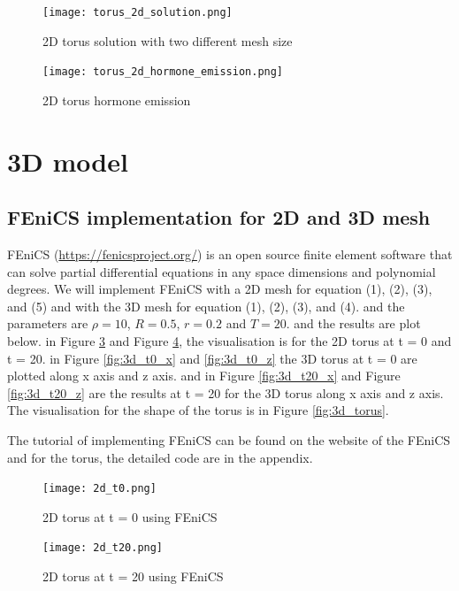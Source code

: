 \documentclass[12pt]{article}
\begin{document}
\begin{figure}[H] %
\centering
\texttt{[image: torus\_2d\_solution.png]}
\caption{2D torus solution with two different mesh size}
\label{fig:2d_fem}
\end{figure}

\begin{figure}[H] %
\centering
\texttt{[image: torus\_2d\_hormone\_emission.png]}
\caption{2D torus hormone emission}
\label{fig:2d_massloss}
\end{figure}


\section{3D model}

\subsection{FEniCS implementation for 2D and 3D mesh}
FEniCS (\url{https://fenicsproject.org/}) is an open source finite element software that can solve partial differential equations in any space dimensions and polynomial degrees. We will implement FEniCS with a 2D mesh for equation (1), (2), (3), and (5) and with the 3D mesh for equation (1), (2), (3), and (4). and the parameters are $\rho = 10$, $R = 0.5$, $r = 0.2$ and $ T = 20$. and the results are plot below. in Figure \ref{fig:2d_t0_fenics} and Figure \ref{fig:2d_t20_fenics}, the visualisation is for the 2D torus at t = 0 and t = 20. in Figure \ref{fig:3d_t0_x} and \ref{fig:3d_t0_z} the 3D torus at t = 0 are plotted along x axis and z axis. and in Figure \ref{fig:3d_t20_x} and Figure \ref{fig:3d_t20_z} are the results at t = 20 for the 3D torus along x axis and z axis. The visualisation for the shape of the torus is in Figure \ref{fig:3d_torus}. \par
The tutorial of implementing FEniCS can be found on the website of the FEniCS and for the torus, the detailed code are in the appendix. \par

\begin{figure}[H] %
\centering
\texttt{[image: 2d\_t0.png]}
\caption{2D torus at t = 0 using FEniCS}
\label{fig:2d_t0_fenics}
\end{figure}

\begin{figure}[H] %
\centering
\texttt{[image: 2d\_t20.png]}
\caption{2D torus at t = 20 using FEniCS}
\label{fig:2d_t20_fenics}
\end{figure}
\end{document}
